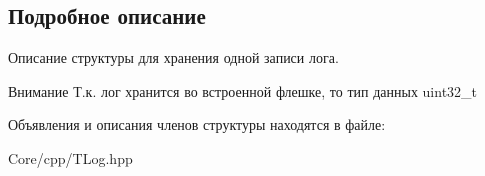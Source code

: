 \subsection{Подробное описание}
Описание структуры для хранения одной записи лога. 

\begin{DoxyAttention}{Внимание}
Т.\+к. лог хранится во встроенной флешке, то тип данных uint32\+\_\+t 
\end{DoxyAttention}


Объявления и описания членов структуры находятся в файле\+:\begin{DoxyCompactItemize}
\item 
Core/cpp/T\+Log.\+hpp\end{DoxyCompactItemize}
